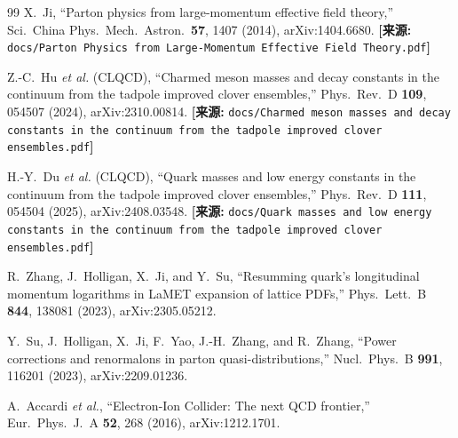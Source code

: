 \documentclass[12pt,a4paper]{ctexart}
\theoremstyle{definition}
\begin{document}
\begin{thebibliography}{99}
X.~Ji,
``Parton physics from large-momentum effective field theory,''
Sci.\ China Phys.\ Mech.\ Astron.\ \textbf{57}, 1407 (2014), arXiv:1404.6680.
\quad\textbf{[来源:} \texttt{docs/Parton Physics from Large-Momentum Effective Field Theory.pdf}\textbf{]}


Z.-C.~Hu \textit{et al.} (CLQCD),
``Charmed meson masses and decay constants in the continuum from the tadpole improved clover ensembles,''
Phys.\ Rev.\ D \textbf{109}, 054507 (2024), arXiv:2310.00814.
\quad\textbf{[来源:} \texttt{docs/Charmed meson masses and decay constants in the continuum from the tadpole improved clover ensembles.pdf}\textbf{]}

H.-Y.~Du \textit{et al.} (CLQCD),
``Quark masses and low energy constants in the continuum from the tadpole improved clover ensembles,''
Phys.\ Rev.\ D \textbf{111}, 054504 (2025), arXiv:2408.03548.
\quad\textbf{[来源:} \texttt{docs/Quark masses and low energy constants in the continuum from the tadpole improved clover ensembles.pdf}\textbf{]}


R.~Zhang, J.~Holligan, X.~Ji, and Y.~Su,
``Resumming quark's longitudinal momentum logarithms in LaMET expansion of lattice PDFs,''
Phys.\ Lett.\ B \textbf{844}, 138081 (2023), arXiv:2305.05212.

Y.~Su, J.~Holligan, X.~Ji, F.~Yao, J.-H.~Zhang, and R.~Zhang,
``Power corrections and renormalons in parton quasi-distributions,''
Nucl.\ Phys.\ B \textbf{991}, 116201 (2023), arXiv:2209.01236.


A.~Accardi \textit{et al.},
``Electron-Ion Collider: The next QCD frontier,''
Eur.\ Phys.\ J.\ A \textbf{52}, 268 (2016), arXiv:1212.1701.

\end{thebibliography}
\end{document}
